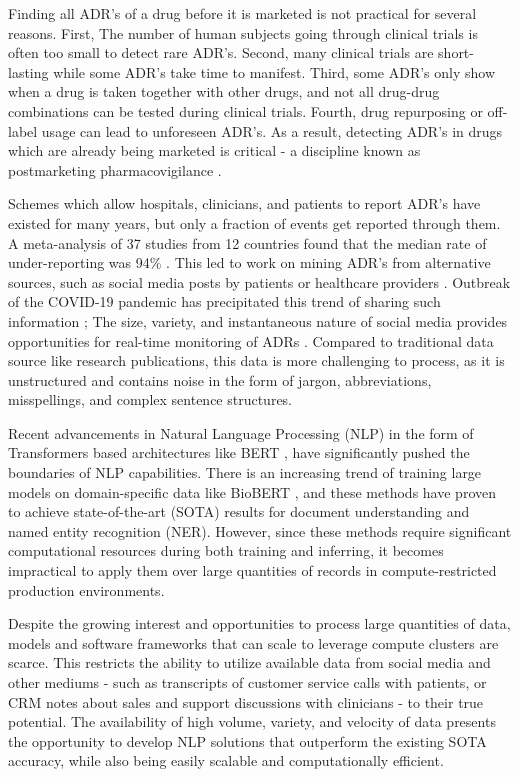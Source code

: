 \documentclass[letterpaper]{article}
\begin{document}
Finding all ADR's of a drug before it is marketed is not practical for several reasons. First, The number of human subjects going through clinical trials is often too small to detect rare ADR's. Second, many clinical trials are short-lasting while some ADR's take time to manifest. Third, some ADR's only show when a drug is taken together with other drugs, and not all drug-drug combinations can be tested during clinical trials. Fourth, drug repurposing or off-label usage can lead to unforeseen ADR's. As a result, detecting ADR's in drugs which are already being marketed is critical - a discipline known as postmarketing pharmacovigilance  \cite{mammi2013pharmacovigilance}.

Schemes which allow hospitals, clinicians, and patients to report ADR's have existed for many years, but only a fraction of events get reported through them. A meta-analysis of 37 studies from 12 countries found that the median rate of under-reporting was 94\% \cite{hazell2006under}. This led to work on mining ADR's from alternative sources, such as social media posts by patients or healthcare providers \cite{bollegala2018causality}. Outbreak of the COVID-19 pandemic has precipitated this trend of sharing such information \cite{cinelli2020covid}; The size, variety, and instantaneous nature of social media provides opportunities for real-time monitoring of ADRs \cite{sloane2015social}. Compared to traditional data source like research publications, this data is more challenging to process, as it is unstructured and contains noise in the form of jargon, abbreviations, misspellings, and complex sentence structures.

Recent advancements in Natural Language Processing (NLP) in the form of Transformers \cite{DBLP:journals/corr/VaswaniSPUJGKP17} based architectures like BERT \cite{DBLP:journals/corr/abs-1810-04805}, have significantly pushed the boundaries of NLP capabilities. There is an increasing trend of training large models on domain-specific data like BioBERT \cite{DBLP:journals/corr/abs-1901-08746}, and these methods have proven to achieve state-of-the-art (SOTA) results for document understanding and named entity recognition (NER). However, since these methods require significant computational resources during both training and inferring, it becomes impractical to apply them over large quantities of records in compute-restricted production environments.

Despite the growing interest and opportunities to process large quantities of data, models and software frameworks that can scale to leverage compute clusters are scarce. This restricts the ability to utilize available data from social media and other mediums - such as transcripts of customer service calls with patients, or CRM notes about sales and support discussions with clinicians - to their true potential. The availability of high volume, variety, and velocity of data presents the opportunity to develop NLP solutions that outperform the existing SOTA accuracy, while also being easily scalable and computationally efficient.
\end{document}
